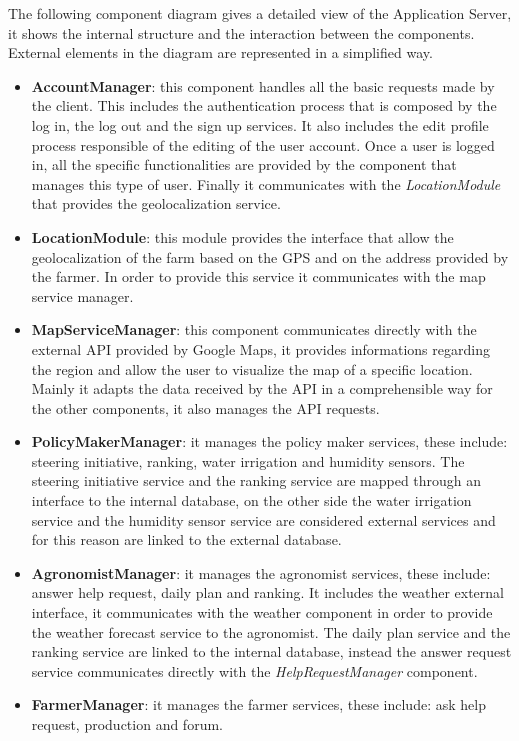 \documentclass[table, 12pt]{article}
\begin{document}
The following component diagram gives a detailed view of the Application Server, it shows the internal structure and the interaction between the components.
External elements in the diagram are represented in a simplified way.
\begin{itemize}
    \item \textbf{AccountManager}: this component handles all the basic requests made by the client.
    This includes the authentication process that is composed by the log in, the log out and the sign up services. 
    It also includes the edit profile process responsible of the editing of the user account.
    Once a user is logged in, all the specific functionalities are provided by the component that manages this type of user.
    Finally it communicates with the \textit{LocationModule} that provides the geolocalization service.
    \item \textbf{LocationModule}: this module provides the interface that allow the geolocalization of the farm based on the GPS and on the address provided by the farmer.
    In order to provide this service it communicates with the map service manager.
    \item \textbf{MapServiceManager}: this component communicates directly with the external API provided by Google Maps, it provides informations regarding the region and allow the user to visualize the map of a specific location.
    Mainly it adapts the data received by the API in a comprehensible way for the other components, it also manages the API requests.
    \item \textbf{PolicyMakerManager}: it manages the policy maker services, these include: steering initiative, ranking, water irrigation and humidity sensors.
    The steering initiative service and the ranking service are mapped through an interface to the internal database, on the other side the water irrigation service and the humidity sensor service are considered external services and for this reason are linked to the external database.
    \item \textbf{AgronomistManager}: it manages the agronomist services, these include: answer help request, daily plan and ranking.
    It includes the weather external interface, it communicates with the weather component in order to provide the weather forecast service to the agronomist.
    The daily plan service and the ranking service are linked to the internal database, instead the answer request service communicates directly with the \textit{HelpRequestManager} component.
    \item \textbf{FarmerManager}: it manages the farmer services, these include: ask help request, production and forum.

\end{itemize}
\end{document}
